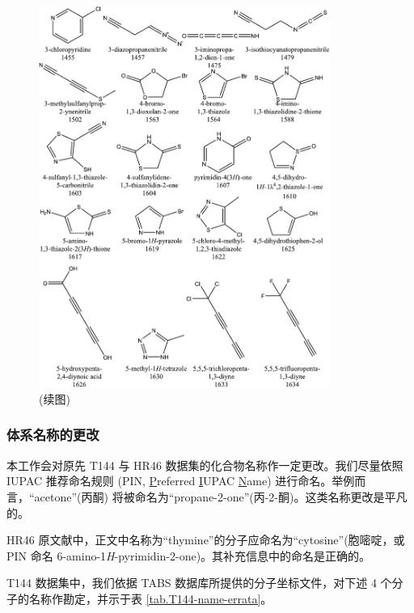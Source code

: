 \begin{figure}[H]
    \centering
    \caption{(续图)}
    \label{fig.fig-s2-5}
    \includegraphics[width=0.85\textwidth]{assets/fig-s2-5.pdf}
\end{figure}

\newpage

\subsubsection{体系名称的更改}
\label{sec.T145-HR46-name-change}

本工作会对原先 T144 与 HR46 数据集的化合物名称作一定更改。我们尽量依照 IUPAC 推荐命名规则 (PIN, \underline{P}referred \underline{I}UPAC \underline{N}ame) 进行命名\cite{Favre-Powell.RSC.2013}。举例而言，“acetone”(丙酮) 将被命名为“propane-2-one”(丙-2-酮)。这类名称更改是平凡的。

HR46 原文献\cite{Hickey-Rowley.JPCA.2014}中，正文中名称为“thymine”的分子应命名为“cytosine”(胞嘧啶，或 PIN 命名 6-amino-1\textit{H}-pyrimidin-2-one)。其补充信息中的命名是正确的。

T144 数据集中，我们依据 TABS 数据库所提供的分子坐标文件，对下述 4 个分子的名称作勘定，并示于表 \ref{tab.T144-name-errata}。


